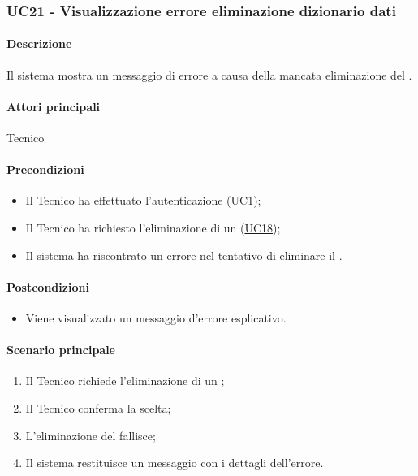 \subsubsection{UC21 - Visualizzazione errore eliminazione dizionario dati}\label{UC21}
\paragraph*{Descrizione}
Il sistema mostra un messaggio di errore a causa della mancata eliminazione del .

\paragraph*{Attori principali}
Tecnico

\paragraph*{Precondizioni}
\begin{itemize}
  \item Il Tecnico ha effettuato l'autenticazione (\hyperref[UC1]{UC1});
  \item Il Tecnico ha richiesto l'eliminazione di un  (\hyperref[UC18]{UC18});
  \item Il sistema ha riscontrato un errore nel tentativo di eliminare il .
\end{itemize}

\paragraph*{Postcondizioni}
\begin{itemize}
  \item Viene visualizzato un messaggio d'errore esplicativo.
\end{itemize}

\paragraph*{Scenario principale}
\begin{enumerate}
  \item Il Tecnico richiede l'eliminazione di un ;
  \item Il Tecnico conferma la scelta;
  \item L'eliminazione del  fallisce;
  \item Il sistema restituisce un messaggio con i dettagli dell'errore.
\end{enumerate}